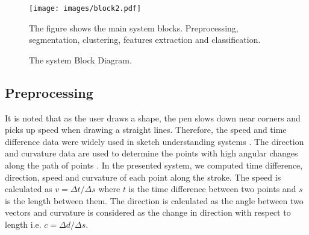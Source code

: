 \documentclass[a4paper,10pt]{IEEEconf}
\begin{document}
\begin{figure}[]
	\centering
		\texttt{[image: images/block2.pdf]}%
	\caption{The system Block Diagram.} The figure shows the main system blocks. Preprocessing, segmentation, clustering, features extraction and classification. 
	
	\label{fig:Blockdiagram}
\end{figure}

\subsection{Preprocessing}
\label{Prepross}
 It is noted that as the user draws a shape, the pen slows down near corners and picks up speed when drawing a straight lines. Therefore, the speed and time difference data were widely used in sketch understanding systems \cite{earlyprocess}.  The direction and curvature data are used to determine the points with high angular changes along the path of points \cite{meanshift10}.  
 In the presented system, we computed time difference, direction, speed and curvature of each point along the stroke. The speed is calculated as  $v=\Delta t/\Delta s$ where $t$ is the time difference between two points and $s$ is the length between them. The direction is calculated as the angle between two vectors and curvature is considered as the change in direction with respect to length i.e. $c= \Delta d/\Delta s$.
 
\end{document}
